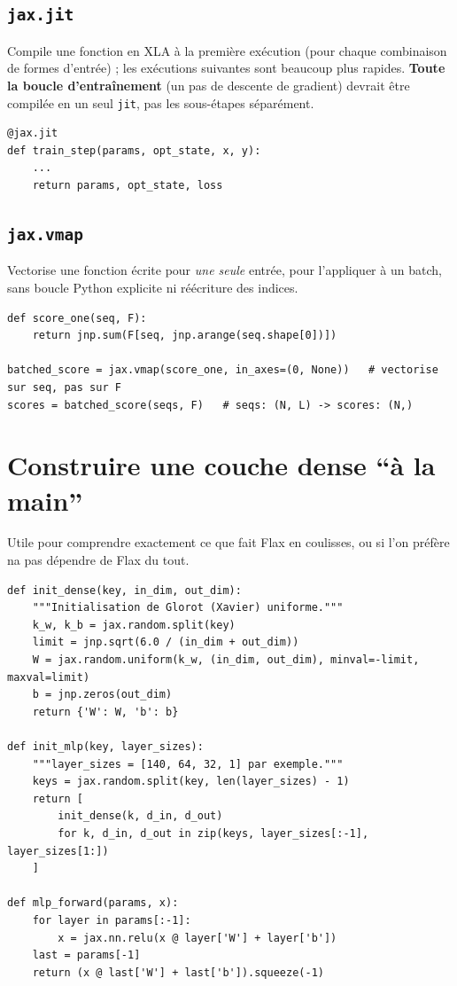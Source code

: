 \documentclass[11pt,a4paper]{article}
\begin{document}
\subsection{\texttt{jax.jit}}
Compile une fonction en XLA à la première exécution (pour chaque
combinaison de formes d'entrée) ; les exécutions suivantes sont beaucoup plus
rapides. \textbf{Toute la boucle d'entraînement} (un pas de descente de
gradient) devrait être compilée en un seul \texttt{jit}, pas les sous-étapes
séparément.

\begin{lstlisting}
@jax.jit
def train_step(params, opt_state, x, y):
    ...
    return params, opt_state, loss
\end{lstlisting}

\subsection{\texttt{jax.vmap}}
Vectorise une fonction écrite pour \emph{une seule} entrée, pour l'appliquer
à un batch, sans boucle Python explicite ni réécriture des indices.

\begin{lstlisting}
def score_one(seq, F):
    return jnp.sum(F[seq, jnp.arange(seq.shape[0])])

batched_score = jax.vmap(score_one, in_axes=(0, None))   # vectorise sur seq, pas sur F
scores = batched_score(seqs, F)   # seqs: (N, L) -> scores: (N,)
\end{lstlisting}

\section{Construire une couche dense ``à la main''}

Utile pour comprendre exactement ce que fait Flax en coulisses, ou si l'on
préfère na pas dépendre de Flax du tout.

\begin{lstlisting}
def init_dense(key, in_dim, out_dim):
    """Initialisation de Glorot (Xavier) uniforme."""
    k_w, k_b = jax.random.split(key)
    limit = jnp.sqrt(6.0 / (in_dim + out_dim))
    W = jax.random.uniform(k_w, (in_dim, out_dim), minval=-limit, maxval=limit)
    b = jnp.zeros(out_dim)
    return {'W': W, 'b': b}

def init_mlp(key, layer_sizes):
    """layer_sizes = [140, 64, 32, 1] par exemple."""
    keys = jax.random.split(key, len(layer_sizes) - 1)
    return [
        init_dense(k, d_in, d_out)
        for k, d_in, d_out in zip(keys, layer_sizes[:-1], layer_sizes[1:])
    ]

def mlp_forward(params, x):
    for layer in params[:-1]:
        x = jax.nn.relu(x @ layer['W'] + layer['b'])
    last = params[-1]
    return (x @ last['W'] + last['b']).squeeze(-1)
\end{lstlisting}
\end{document}
